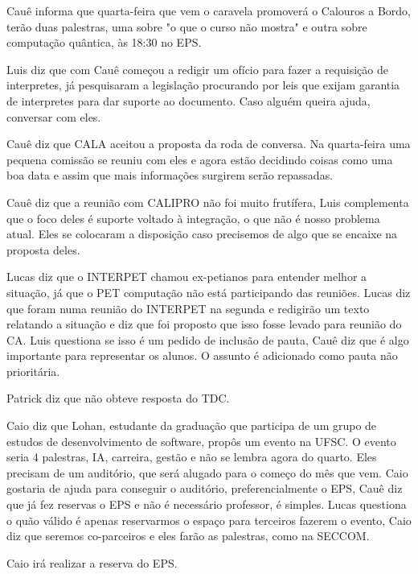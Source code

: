 \documentclass{ata-calico}
\begin{document}
\maketitle
{}
Cauê informa que quarta-feira que vem o caravela promoverá o Calouros a Bordo, terão duas palestras, uma sobre "o que o curso não mostra" e outra sobre computação quântica, às 18:30 no EPS.

Luis diz que com Cauê começou a redigir um ofício para fazer a requisição de interpretes, já pesquisaram a legislação procurando por leis que exijam garantia de interpretes para dar suporte ao documento. Caso alguém queira ajuda, conversar com eles.

Cauê diz que CALA aceitou a proposta da roda de conversa. Na quarta-feira uma pequena comissão se reuniu com eles e agora estão decidindo coisas como uma boa data e assim que mais informações surgirem serão repassadas.

Cauê diz que a reunião com CALIPRO não foi muito frutífera, Luis complementa que o foco deles é suporte voltado à integração, o que não é nosso problema atual. Eles se colocaram a disposição caso precisemos de algo que se encaixe na proposta deles.

Lucas diz que o INTERPET chamou ex-petianos para entender melhor a situação, já que o PET computação não está participando das reuniões. Lucas diz que foram numa reunião do INTERPET na segunda e redigirão um texto relatando a situação e diz que foi proposto que isso fosse levado para reunião do CA. Luis questiona se isso é um pedido de inclusão de pauta, Cauê diz que é algo importante para representar os alunos. O assunto é adicionado como pauta não prioritária.

Patrick diz que não obteve resposta do TDC.

Caio diz que Lohan, estudante da graduação que participa de um grupo de estudos de desenvolvimento de software, propôs um evento na UFSC. O evento seria 4 palestras, IA, carreira, gestão e não se lembra agora do quarto. Eles precisam de um auditório, que será alugado para o começo do mês que vem. Caio gostaria de ajuda para conseguir o auditório, preferencialmente o EPS, Cauê diz que já fez reservas o EPS e não é necessário professor, é simples. Lucas questiona o quão válido é apenas reservarmos o espaço para terceiros fazerem o evento, Caio diz que seremos co-parceiros e eles farão as palestras, como na SECCOM. 

Caio irá realizar a reserva do EPS.
\end{document}
